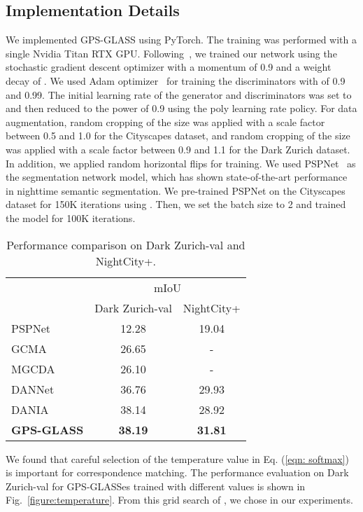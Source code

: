 \documentclass[10pt,twocolumn,letterpaper]{article}
\begin{document}
\subsection{Implementation Details}
We implemented GPS-GLASS using PyTorch. The training was performed with a single Nvidia Titan RTX GPU. Following~\cite{chen2017deeplab}, we trained our network using the stochastic gradient descent optimizer with a momentum of 0.9 and a weight decay of . We used Adam optimizer~\cite{kingma2014adam} for training the discriminators with  of 0.9 and 0.99. The initial learning rate of the generator and discriminators was set to  and then reduced to the power of 0.9 using the poly learning rate policy. For data augmentation, random cropping of the size  was applied with a scale factor between 0.5 and 1.0 for the Cityscapes dataset, and random cropping of the size  was applied with a scale factor between 0.9 and 1.1 for the Dark Zurich dataset. In addition, we applied random horizontal flips for training. We used PSPNet~\cite{zhao2017pyramid} as the segmentation network model, which has shown state-of-the-art performance in nighttime semantic segmentation. We pre-trained PSPNet on the Cityscapes dataset for 150K iterations using . Then, we set the batch size to 2 and trained the model for 100K iterations.

\begin{table}[t!]
  \centering
  \renewcommand{\arraystretch}{.9}
  \caption{Performance comparison on Dark Zurich-val and NightCity+.}
  \begin{tabular}{lcc}
  \toprule\
        \multirow{2}{*}{Method}&\multicolumn{2}{c}{mIoU}\\ \cmidrule{2-3}
        &Dark Zurich-val&NightCity+\\
        \midrule
        PSPNet&12.28&19.04\\
        \midrule
        GCMA&26.65&-\\
        MGCDA&26.10&-\\
        DANNet&36.76&29.93\\
        DANIA&  38.14&28.92\\
        \midrule
        \bf GPS-GLASS&\bf 38.19&\bf31.81\\
        \bottomrule
    \end{tabular}
    \label{table:other_dataset}
\end{table}

We found that careful selection of the temperature value  in Eq. (\ref{eqn: softmax}) is important for correspondence matching. The performance evaluation on Dark Zurich-val for GPS-GLASSes trained with different  values is shown in Fig.~\ref{figure:temperature}. From this grid search of , we chose  in our experiments. 
\end{document}
